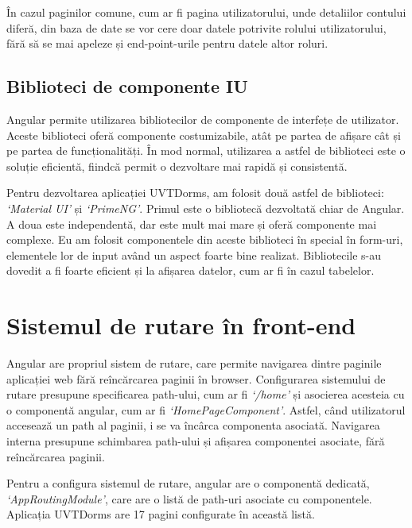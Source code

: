 \documentclass[12pt,a4paper]{report}
\theoremstyle{definition}
\theoremstyle{remark}
\begin{document}
\par În cazul paginilor comune, cum ar fi pagina utilizatorului, unde detaliilor contului diferă, din baza de date se vor cere doar datele potrivite rolului utilizatorului, fără să se mai apeleze și end-point-urile pentru datele altor roluri.

\subsection{Biblioteci de componente IU}

\par Angular permite utilizarea bibliotecilor de componente de interfețe de utilizator. Aceste biblioteci oferă componente costumizabile, atât pe partea de afișare cât și pe partea de funcționalități. În mod normal, utilizarea a astfel de biblioteci este o soluție eficientă, fiindcă permit o dezvoltare mai rapidă și consistentă.

\par Pentru dezvoltarea aplicației UVTDorms, am folosit două astfel de biblioteci: \textit{`Material UI'} și \textit{`PrimeNG'}. Primul este o bibliotecă dezvoltată chiar de Angular. A doua este independentă, dar este mult mai mare și oferă componente mai complexe. Eu am folosit componentele din aceste biblioteci în special în form-uri, elementele lor de input având un aspect foarte bine realizat. Bibliotecile s-au dovedit a fi foarte eficient și la afișarea datelor, cum ar fi în cazul tabelelor. 

\section{Sistemul de rutare în front-end}

\par Angular are propriul sistem de rutare, care permite navigarea dintre paginile \textnormal{ap\-li\-ca\-ți\-ei} web fără reîncărcarea paginii în browser. Configurarea sistemului de rutare presupune specificarea path-ului, cum ar fi \textit{`/home'} și asocierea acesteia cu o componentă angular, cum ar fi \textit{`HomePageComponent'}. Astfel, când utilizatorul accesează un path al paginii, i se va încârca componenta asociată. Navigarea interna presupune schimbarea path-ului și afișarea componentei asociate, fără reîncărcarea paginii.

\par Pentru a configura sistemul de rutare, angular are o componentă dedicată, \textit{`AppRoutingModule'}, care are o listă de path-uri asociate cu componentele. Aplicația UVTDorms are 17 pagini configurate în această listă.
\end{document}
